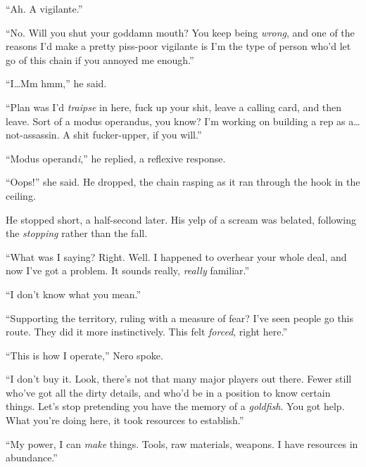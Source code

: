 ``Ah.  A vigilante.''



``No.  Will you shut your goddamn mouth?  You keep being \emph{wrong}, and one of the reasons I'd make a pretty piss-poor vigilante is I'm the type of person who'd let go of this chain if you annoyed me enough.''



``I\ldots Mm hmm,'' he said.



``Plan was I'd \emph{traipse} in here, fuck up your shit, leave a calling card, and then leave.  Sort of a modus operandus, you know?  I'm working on building a rep as a\ldots not-assassin.  A shit fucker-upper, if you will.''



``Modus operand\emph{i},'' he replied, a reflexive response.



``Oops!'' she said.  He dropped, the chain rasping as it ran through the hook in the ceiling.



He stopped short, a half-second later.  His yelp of a scream was belated, following the \emph{stopping} rather than the fall.



``What was I saying?  Right.  Well.  I happened to overhear your whole deal, and now I've got a problem.  It sounds really, \emph{really} familiar.''



``I don't know what you mean.''



``Supporting the territory, ruling with a measure of fear?  I've seen people go this route.  They did it more instinctively.  This felt \emph{forced}, right here.''



``This is how I operate,'' Nero spoke.



``I don't buy it.  Look, there's not that many major players out there.  Fewer still who've got all the dirty details, and who'd be in a position to know certain things.  Let's stop pretending you have the memory of a \emph{goldfish}.  You got help.  What you're doing here, it took resources to establish.''



``My power, I can \emph{make} things.  Tools, raw materials, weapons.  I have resources in abundance.''



